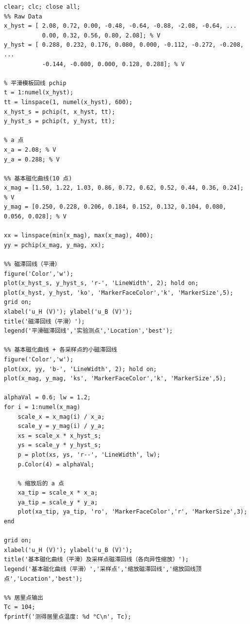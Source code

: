 ﻿\documentclass[12pt,a4paper]{article}
\begin{document}
\begin{lstlisting}[style=Matlab-boxed,caption={磁滞回线与基本磁化曲线数据处理代码}]
clear; clc; close all;
%% Raw Data
x_hyst = [ 2.08, 0.72, 0.00, -0.48, -0.64, -0.88, -2.08, -0.64, ...
           0.00, 0.32, 0.56, 0.80, 2.08]; % V
y_hyst = [ 0.288, 0.232, 0.176, 0.080, 0.000, -0.112, -0.272, -0.208, ...
           -0.144, -0.080, 0.000, 0.128, 0.288]; % V

% 平滑模板回线 pchip
t = 1:numel(x_hyst);
tt = linspace(1, numel(x_hyst), 600);
x_hyst_s = pchip(t, x_hyst, tt);
y_hyst_s = pchip(t, y_hyst, tt);

% a 点
x_a = 2.08; % V
y_a = 0.288; % V

%% 基本磁化曲线(10 点)
x_mag = [1.50, 1.22, 1.03, 0.86, 0.72, 0.62, 0.52, 0.44, 0.36, 0.24]; % V
y_mag = [0.250, 0.228, 0.206, 0.184, 0.152, 0.132, 0.104, 0.080, 0.056, 0.028]; % V

xx = linspace(min(x_mag), max(x_mag), 400);
yy = pchip(x_mag, y_mag, xx);

%% 磁滞回线（平滑）
figure('Color','w');
plot(x_hyst_s, y_hyst_s, 'r-', 'LineWidth', 2); hold on;
plot(x_hyst, y_hyst, 'ko', 'MarkerFaceColor','k', 'MarkerSize',5);
grid on;
xlabel('u_H (V)'); ylabel('u_B (V)');
title('磁滞回线（平滑）');
legend('平滑磁滞回线','实验测点','Location','best');

%% 基本磁化曲线 + 各采样点的小磁滞回线
figure('Color','w');
plot(xx, yy, 'b-', 'LineWidth', 2); hold on;
plot(x_mag, y_mag, 'ks', 'MarkerFaceColor','k', 'MarkerSize',5);

alphaVal = 0.6; lw = 1.2;
for i = 1:numel(x_mag)
    scale_x = x_mag(i) / x_a;
    scale_y = y_mag(i) / y_a;
    xs = scale_x * x_hyst_s;
    ys = scale_y * y_hyst_s;
    p = plot(xs, ys, 'r--', 'LineWidth', lw);
    p.Color(4) = alphaVal;
    
    % 缩放后的 a 点
    xa_tip = scale_x * x_a;
    ya_tip = scale_y * y_a;
    plot(xa_tip, ya_tip, 'ro', 'MarkerFaceColor','r', 'MarkerSize',3);
end

grid on;
xlabel('u_H (V)'); ylabel('u_B (V)');
title('基本磁化曲线（平滑）及采样点磁滞回线（各向异性缩放）');
legend('基本磁化曲线（平滑）','采样点','缩放磁滞回线','缩放回线顶点','Location','best');

%% 居里点输出
Tc = 104;
fprintf('测得居里点温度: %d °C\n', Tc);
\end{lstlisting}
\end{document}
